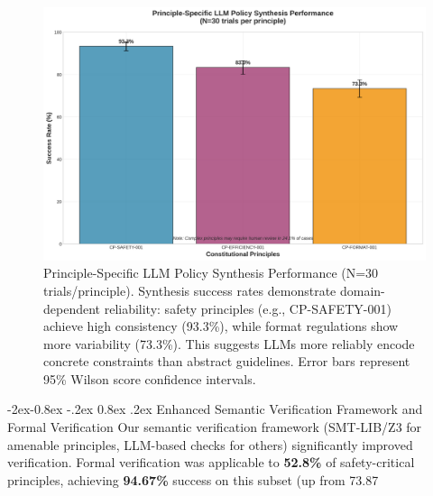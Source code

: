 \documentclass[manuscript,screen,9pt]{acmart}
\makeatletter
\renewcommand\subsubsection{\@startsection{subsubsection}{3}{\z@}%
  {-2ex\@plus -0.8ex \@minus -.2ex}%
  {0.8ex \@plus .2ex}%
  {\normalfont\normalsize\bfseries}}
\makeatother
\begin{document}
\FloatBarrier %
\begin{figure}[!htb]
	\centering
	\includegraphics[width=\linewidth,keepaspectratio]{figures/Figure_3_Rule_Synthesis_Success_Rate_per_Principle.png}
	\caption[Principle-Specific LLM Policy Synthesis Performance]{Principle-Specific LLM Policy Synthesis Performance (N=30 trials/principle). Synthesis success rates demonstrate domain-dependent reliability: safety principles (e.g., CP-SAFETY-001) achieve high consistency (93.3\%), while format regulations show more variability (73.3\%). This suggests LLMs more reliably encode concrete constraints than abstract guidelines. Error bars represent 95\% Wilson score confidence intervals.}
	\label{fig:rule_synthesis_chart}
\end{figure}

\subsubsection{Enhanced Semantic Verification Framework and Formal Verification}
\label{subsubsec:enhanced_verification}
Our semantic verification framework (SMT-LIB/Z3 for amenable principles, LLM-based checks for others) significantly improved verification. Formal verification was applicable to \textbf{52.8\%} of safety-critical principles, achieving \textbf{94.67\%} success on this subset (up from 73.87%
\end{document}
